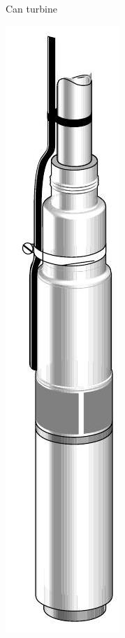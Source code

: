 \documentclass[10pt]{article}
\begin{document}
Can turbine

\includegraphics[max width=\textwidth]{SubmersibleTurbinePump}
\end{document}
